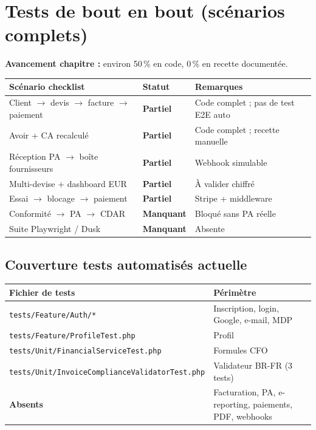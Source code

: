 \documentclass[11pt,a4paper]{report}
\newcommand{\route}[1]{\texttt{\small #1}}
\newcommand{\statpart}{\textcolor{statpartial}{\textbf{Partiel}}}
\newcommand{\statmiss}{\textcolor{statno}{\textbf{Manquant}}}
\begin{document}
\chapter{Tests de bout en bout (scénarios complets)}

\textbf{Avancement chapitre :} environ 50\,\% en code, 0\,\% en recette documentée.

\begin{longtable}{@{}L{7.8cm}C{2.4cm}L{4.4cm}@{}}
    \toprule
    \textbf{Scénario checklist} & \textbf{Statut} & \textbf{Remarques} \\
    \midrule
    \endhead
    Client $\rightarrow$ devis $\rightarrow$ facture $\rightarrow$ paiement & \statpart & Code complet ; pas de test E2E auto \\
    Avoir + CA recalculé & \statpart & Code complet ; recette manuelle \\
    Réception PA $\rightarrow$ boîte fournisseurs & \statpart & Webhook simulable \\
    Multi-devise + dashboard EUR & \statpart & À valider chiffré \\
    Essai $\rightarrow$ blocage $\rightarrow$ paiement & \statpart & Stripe + middleware \\
    Conformité $\rightarrow$ PA $\rightarrow$ CDAR & \statmiss & Bloqué sans PA réelle \\
    Suite Playwright / Dusk & \statmiss & Absente \\
    \bottomrule
\end{longtable}

\section{Couverture tests automatisés actuelle}

\begin{table}[htbp]
    \centering
    \renewcommand{\arraystretch}{1.2}
    \begin{tabular}{@{}L{6cm}L{8.5cm}@{}}
        \toprule
        \textbf{Fichier de tests} & \textbf{Périmètre} \\
        \midrule
        \route{tests/Feature/Auth/*} & Inscription, login, Google, e-mail, MDP \\
        \route{tests/Feature/ProfileTest.php} & Profil \\
        \route{tests/Unit/FinancialServiceTest.php} & Formules CFO \\
        \route{tests/Unit/InvoiceComplianceValidatorTest.php} & Validateur BR-FR (3 tests) \\
        \textbf{Absents} & Facturation, PA, e-reporting, paiements, PDF, webhooks \\
        \bottomrule
    \end{tabular}
\end{table}
\end{document}
